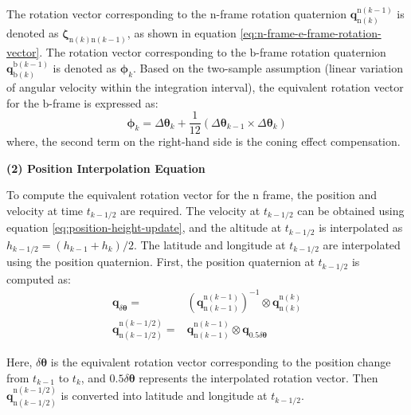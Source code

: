 \documentclass{article}
\begin{document}
The rotation vector corresponding to the $\mathrm{n}$-frame rotation quaternion $\mathbf{q}_{\mathrm{n}(k)}^{\mathrm{n}(k-1)}$ is denoted as $\boldsymbol{\zeta}_{\mathrm{n}(k)\mathrm{n}(k-1)}$, as shown in equation \eqref{eq:n-frame-e-frame-rotation-vector}. The rotation vector corresponding to the $\mathrm{b}$-frame rotation quaternion $\mathbf{q}_{\mathrm{b}(k)}^{\mathrm{b}(k-1)}$ is denoted as $\boldsymbol{\phi}_{k}$. Based on the two-sample assumption (linear variation of angular velocity within the integration interval), the equivalent rotation vector for the $\mathrm{b}$-frame is expressed as:
\begin{equation}
    \boldsymbol{\phi}_{k} = \Delta \boldsymbol{\theta}_{k} + \frac{1}{12} \left( \Delta \boldsymbol{\theta}_{k-1} \times \Delta \boldsymbol{\theta}_{k} \right)
    \label{eq:b-frame-rotation-vector}
\end{equation}
where, the second term on the right-hand side is the coning effect compensation.

\textbf{(2) Position Interpolation Equation}

To compute the equivalent rotation vector for the $\mathrm{n}$ frame, the position and velocity at time $t_{k-1/2}$ are required. The velocity at $t_{k-1/2}$ can be obtained using equation \eqref{eq:position-height-update}, and the altitude at $t_{k-1/2}$ is interpolated as ${h}_{k-1/2} = ({h}_{k-1} + {h}_{k})/2$. The latitude and longitude at $t_{k-1/2}$ are interpolated using the position quaternion. First, the position quaternion at $t_{k-1/2}$ is computed as:
\begin{equation}
    \begin{aligned}
        \mathbf{q}_{\delta \boldsymbol{\theta}} =& \left(\mathbf{q}_{\mathrm{n}(k-1)}^{\mathrm{n}(k-1)}\right)^{-1} \otimes \mathbf{q}_{\mathrm{n}(k)}^{\mathrm{n}(k)} \\
        \mathbf{q}_{\mathrm{n}(k-1/2)}^{\mathrm{n}(k-1/2)} =& \mathbf{q}_{\mathrm{n}(k-1)}^{\mathrm{n}(k-1)} \otimes \mathbf{q}_{0.5 \delta \boldsymbol{\theta}}
    \end{aligned} 
    \label{eq:position-quaternion-interpolation}
\end{equation}

Here, $\delta \boldsymbol{\theta}$ is the equivalent rotation vector corresponding to the position change from $t_{k-1}$ to $t_k$, and $0.5 \delta \boldsymbol{\theta}$ represents the interpolated rotation vector. Then $\mathbf{q}_{\mathrm{n}(k-1/2)}^{\mathrm{n}(k-1/2)}$ is converted into latitude and longitude at $t_{k-1/2}$.
\end{document}
